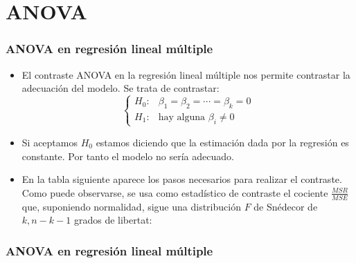 \section{ANOVA}
\begin{frame}
\frametitle{ANOVA en regresión lineal múltiple}
\begin{itemize}
\item<2->{El contraste ANOVA en la regresión lineal múltiple nos permite contrastar la adecuación del modelo. Se trata de contrastar: 
$$\left\{\begin{array}{rl} H_0:& \beta_1=\beta_2=\cdots=\beta_k=0 \\
H_1: & \mbox{hay alguna }\beta_i\not= 0 \end{array}\right.$$
}
\item<3->{Si aceptamos $H_0$ estamos diciendo que la estimación dada por la
regresión es constante. Por tanto el modelo no sería adecuado.}
\item<4->{En la tabla siguiente aparece los pasos necesarios para realizar el contraste. Como puede observarse, se usa como estadístico de contraste el cociente $\frac{MSR}{MSE}$ que, suponiendo normalidad, sigue una distribución $F$ de Snédecor de $k,n-k-1$ grados de libertat:
}
\end{itemize}
\end{frame}
\begin{frame}
\frametitle{ANOVA en regresión lineal múltiple}
\end{frame}
